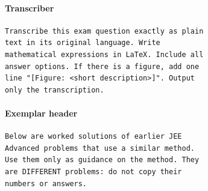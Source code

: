 \paragraph{Transcriber}
\begin{small}\begin{verbatim}
Transcribe this exam question exactly as plain
text in its original language. Write
mathematical expressions in LaTeX. Include all
answer options. If there is a figure, add one
line "[Figure: <short description>]". Output
only the transcription.
\end{verbatim}\end{small}

\paragraph{Exemplar header}
\begin{small}\begin{verbatim}
Below are worked solutions of earlier JEE
Advanced problems that use a similar method.
Use them only as guidance on the method. They
are DIFFERENT problems: do not copy their
numbers or answers.
\end{verbatim}\end{small}
